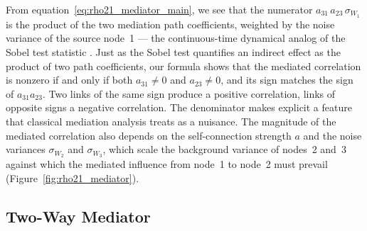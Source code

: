 \documentclass[12pt]{article}
\begin{document}
\vspace{6pt}
From equation~\ref{eq:rho21_mediator_main}, we see that the
numerator $a_{31}\,a_{23}\,\sigma_{W_1}$ is the product of
the two mediation path coefficients, weighted by the noise
variance of the source node~1 --- the continuous-time
dynamical analog of the Sobel test statistic \citep{Sobel1982}.
Just as the Sobel test quantifies an indirect effect as the
product of two path coefficients, our formula shows that the
mediated correlation is nonzero if and only if both
$a_{31}\neq0$ and $a_{23}\neq0$, and its sign matches the
sign of $a_{31}a_{23}$.
Two links of the same sign produce a positive correlation,
links of opposite signs a negative correlation.
The denominator makes explicit a feature that classical
mediation analysis treats as a nuisance.
The magnitude of the mediated correlation also depends on the
self-connection strength $a$ and the noise variances
$\sigma_{W_2}$ and $\sigma_{W_3}$, which scale the background
variance of nodes~2 and~3 against which the mediated influence from node~1 to node~2 must prevail (Figure~\ref{fig:rho21_mediator}).

\subsection*{Two-Way Mediator}
\end{document}
